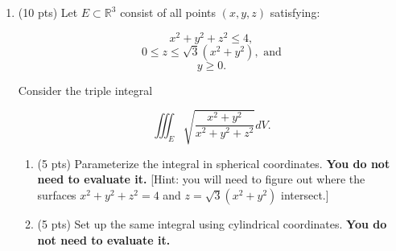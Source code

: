 \documentclass[12 pt]{report}
\begin{document}
\begin{enumerate}
\item (10 pts) Let $E \subset \mathbb{R}^3$ consist of all points $(x,y,z)$ satisfying:

$$x^2 + y^2 + z^2 \leq 4,$$
$$0 \leq z \leq \sqrt{3} (x^2+y^2), \text{ and}$$
$$y \geq 0.$$

Consider the triple integral 

$$ \iiint_E \sqrt{\frac{x^2+y^2}{x^2+y^2+z^2}} dV.$$

\begin{enumerate} \item (5 pts) Parameterize the integral in spherical coordinates. \textbf{You do not need to evaluate it.} [Hint: you will need to figure out where the surfaces $x^2+y^2+z^2 = 4$ and $z = \sqrt{3} (x^2+y^2)$ intersect.]


\pagebreak

\item (5 pts) Set up the same integral using cylindrical coordinates. \textbf{You do not need to evaluate it.} 

\end{enumerate}


\end{enumerate}
\end{document}
